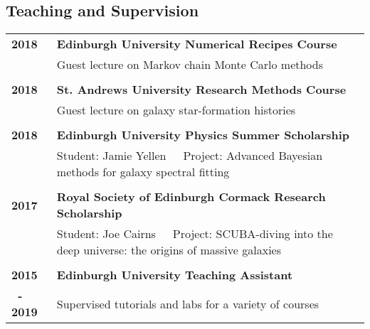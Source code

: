 \documentclass[a4paper,fleqn,usenatbib,onecolumn]{mnras}
\begin{document}
\subsection*{Teaching and Supervision}
\begingroup
\setlength{\tabcolsep}{0pt} %
\renewcommand{\arraystretch}{1.05} %
\begin{longtable}{ p{2cm} p{15cm} }

\bf{2018} & \bf{Edinburgh University Numerical Recipes Course}\\
& Guest lecture on Markov chain Monte Carlo methods\\

\\

\bf{2018} & \bf{St. Andrews University Research Methods Course}\\
& Guest lecture on galaxy star-formation histories\\

\\

\bf{2018} & \bf{Edinburgh University Physics Summer Scholarship}\\
& Student: Jamie Yellen\ \ \ Project: Advanced Bayesian methods for galaxy spectral fitting\\

\\

\bf{2017} & \bf{Royal Society of Edinburgh Cormack Research Scholarship}\\
& Student: Joe Cairns\ \ \ Project: SCUBA-diving into the deep universe: the origins of massive galaxies\\

\\

\bf{2015} & \bf{Edinburgh University Teaching Assistant}\\
\bf{\ - 2019}& Supervised tutorials and labs for a variety of courses\\
\end{longtable}
\endgroup
\end{document}

